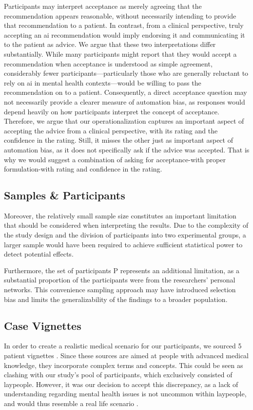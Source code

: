 \documentclass[sigconf,natbib=false]{acmart}
\begin{document}
Participants may interpret acceptance as merely agreeing that the recommendation appears reasonable, without necessarily intending to provide that recommendation to a patient.
In contrast, from a clinical perspective, truly accepting an \Gls{ai} recommendation would imply endorsing it and communicating it to the patient as advice.
We argue that these two interpretations differ substantially. While many participants might report that they would accept a recommendation when acceptance is understood as simple agreement, considerably fewer participants—particularly those who are generally reluctant to rely on \Gls{ai} in mental health contexts—would be willing to pass the recommendation on to a patient.
Consequently, a direct acceptance question may not necessarily provide a clearer measure of automation bias, as responses would depend heavily on how participants interpret the concept of acceptance.
Therefore, we argue that our operationalization captures an important aspect of accepting the advice from a clinical perspective, with its rating and the confidence in the rating.
Still, it misses the other just as important aspect of automation bias, as it does not specifically ask if the advice was accepted.
That is why we would suggest a combination of asking for acceptance-with proper formulation-with rating and confidence in the rating.

\subsection{Samples \& Participants}
Moreover, the relatively small sample size constitutes an important limitation that should be considered when interpreting the results. Due to the complexity of the study design and the division of participants into two experimental groups, a larger sample would have been required to achieve sufficient statistical power to detect potential effects. 

Furthermore, the set of participants \acrshort{P} represents an additional limitation, as a substantial proportion of the participants were from the researchers’ personal networks. This convenience sampling approach may have introduced selection bias and limits the generalizability of the findings to a broader population.

\subsection{Case Vignettes}

In order to create a realistic medical scenario for our participants, we sourced 5 patient vignettes \autocite[]{dbjr_stoerungsbilder, theraphysia_mentale_gesundheit, bar_fallbeispiel_psyche_psychosomatik}.
Since these sources are aimed at people with advanced medical knowledge, they incorporate complex terms and concepts.
This could be seen as clashing with our study’s pool of participants, which exclusively consisted of laypeople. 
However, it was our decision to accept this discrepancy, as a lack of understanding regarding mental health issues is not uncommon within laypeople, and would thus resemble a real life scenario \autocite[]{lacketal_misunderstanding}.
\end{document}
